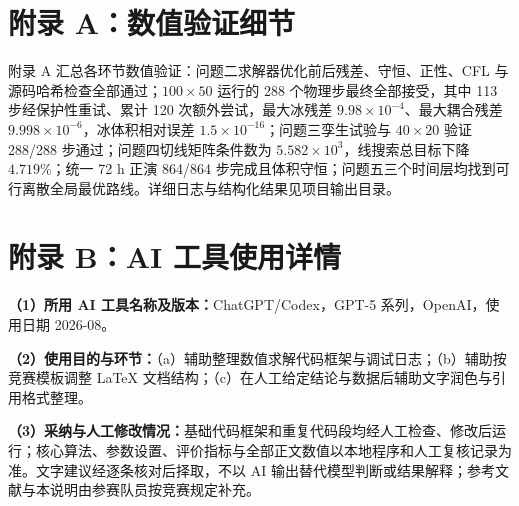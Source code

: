 \documentclass[UTF8,fontset=none]{ctexart}
\begin{document}
\newpage
\appendix
\section*{附录 A：数值验证细节}

附录 A 汇总各环节数值验证：问题二求解器优化前后残差、守恒、正性、CFL 与源码哈希检查全部通过；$100\times50$ 运行的 288 个物理步最终全部接受，其中 113 步经保护性重试、累计 120 次额外尝试，最大冰残差 $9.98\times10^{-4}$、最大耦合残差 $9.998\times10^{-6}$，冰体积相对误差 $1.5\times10^{-16}$；问题三孪生试验与 $40\times20$ 验证 288/288 步通过；问题四切线矩阵条件数为 $5.582\times10^3$，线搜索总目标下降 $4.719\%$；统一 72 h 正演 864/864 步完成且体积守恒；问题五三个时间层均找到可行离散全局最优路线。详细日志与结构化结果见项目输出目录。

\section*{附录 B：AI 工具使用详情}

\par \textbf{（1）所用 AI 工具名称及版本：}ChatGPT/Codex，GPT-5 系列，OpenAI，使用日期 2026-08。
\par \textbf{（2）使用目的与环节：}（a）辅助整理数值求解代码框架与调试日志；（b）辅助按竞赛模板调整 LaTeX 文档结构；（c）在人工给定结论与数据后辅助文字润色与引用格式整理。
\par \textbf{（3）采纳与人工修改情况：}基础代码框架和重复代码段均经人工检查、修改后运行；核心算法、参数设置、评价指标与全部正文数值以本地程序和人工复核记录为准。文字建议经逐条核对后择取，不以 AI 输出替代模型判断或结果解释；参考文献与本说明由参赛队员按竞赛规定补充。
\end{document}
